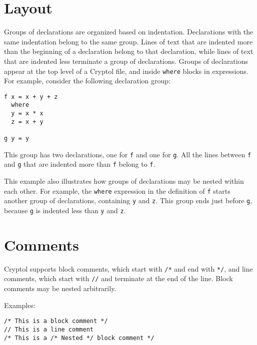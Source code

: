 
\section{Layout}\label{layout}

Groups of declarations are organized based on indentation. Declarations
with the same indentation belong to the same group. Lines of text that
are indented more than the beginning of a declaration belong to that
declaration, while lines of text that are indented less terminate a
group of declarations. Groups of declarations appear at the top level of
a Cryptol file, and inside \texttt{where} blocks in expressions. For
example, consider the following declaration group:

\begin{verbatim}
f x = x + y + z
  where
  y = x * x
  z = x + y

g y = y
\end{verbatim}

This group has two declarations, one for \texttt{f} and one for
\texttt{g}. All the lines between \texttt{f} and \texttt{g} that are
indented more than \texttt{f} belong to \texttt{f}.

This example also illustrates how groups of declarations may be nested
within each other. For example, the \texttt{where} expression in the
definition of \texttt{f} starts another group of declarations,
containing \texttt{y} and \texttt{z}. This group ends just before
\texttt{g}, because \texttt{g} is indented less than \texttt{y} and
\texttt{z}.

\section{Comments}\label{comments}

Cryptol supports block comments, which start with \texttt{/*} and end
with \texttt{*/}, and line comments, which start with \texttt{//} and
terminate at the end of the line. Block comments may be nested
arbitrarily.

Examples:

\begin{verbatim}
/* This is a block comment */
// This is a line comment
/* This is a /* Nested */ block comment */
\end{verbatim}


